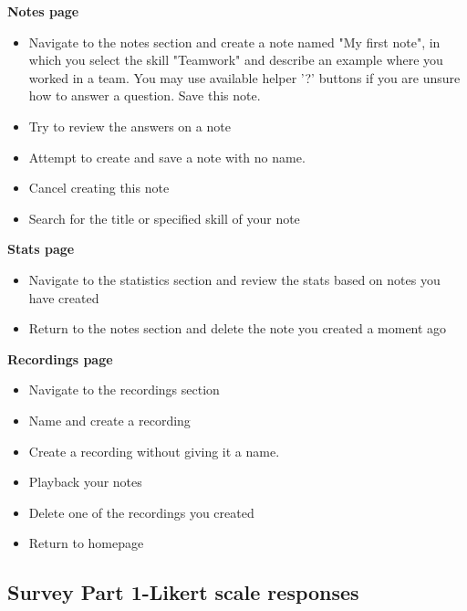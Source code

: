 \documentclass{l4proj}
\begin{document}
\begin{appendices}
\textbf{Notes page}

\begin{itemize}
    \item Navigate to the notes section and create a note named "My first note", in which you select the skill "Teamwork" and describe an example where you worked in a team. You may use available helper '?' buttons if you are unsure how to answer a question. Save this note.
    \item Try to review the answers on a note
    \item Attempt to create and save a note with no name.
    \item Cancel creating this note
    \item Search for the title or specified skill of your note
\end{itemize}

\textbf{Stats page}

\begin{itemize}
    \item Navigate to the statistics section and review the stats based on notes you have created
    \item Return to the notes section and delete the note you created a moment ago
\end{itemize}

\textbf{Recordings page}

\begin{itemize}
    \item Navigate to the recordings section
    \item Name and create a recording
    \item Create a recording without giving it a name.
    \item Playback your notes
    \item Delete one of the recordings you created
    \item Return to homepage
\end{itemize}


\subsection{Survey Part 1-Likert scale responses}


\end{appendices}
\end{document}
